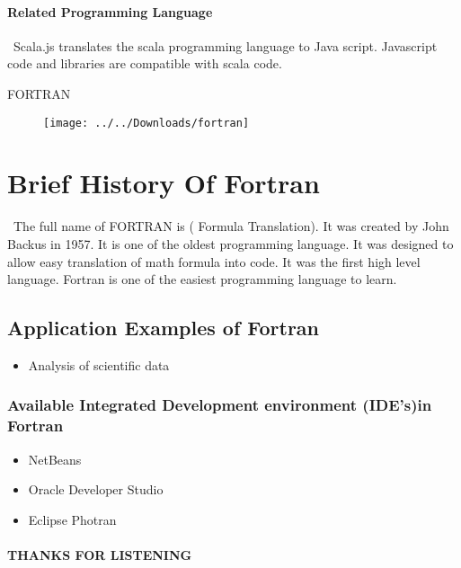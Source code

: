 \documentclass{article}
\begin{document}
\paragraph{Related Programming Language}
\ Scala.js translates the scala programming language to Java script. Javascript code and libraries are compatible with scala code.
\newpage
\begin{center}
	FORTRAN
\begin{figure}[h]
	\texttt{[image: ../../Downloads/fortran]}
	\label{fig:fortran}
\end{figure}
\end{center}
\section{Brief History Of Fortran}
\ The full name of FORTRAN is ( Formula Translation). It was created by John Backus in 1957. It is one of the oldest programming language. It was designed to allow easy translation of math formula into code.
It was the first high level language. Fortran is one of the easiest programming language to learn.
\subsection{Application Examples of Fortran}
\begin{itemize}
  \item Analysis of scientific data
\end{itemize}
\subsubsection{Available Integrated Development environment (IDE’s)in Fortran}
\begin{itemize}
	\item NetBeans
	\item Oracle Developer Studio
	\item Eclipse Photran
\end{itemize}
\newpage
\paragraph{THANKS FOR LISTENING}
\end{document}

